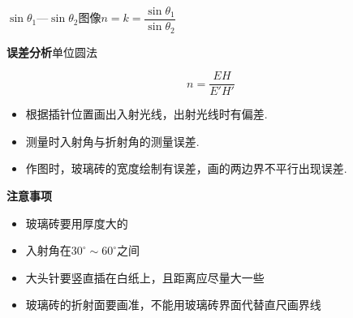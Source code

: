 
$\sin\theta_1$—$\sin\theta_2$图像\qquad $n=k=\dfrac{\sin\theta_1}{\sin\theta_2}$

\textbf{误差分析}\quad 单位圆法


\[ n=\frac{EH}{E'H'} \]

\begin{itemize}
\item[\unclear{①}] 根据插针位置画出入射光线，出射光线时有偏差. %
\item[②] 测量时入射角与折射角的测量误差.
\item[③] 作图时，玻璃砖的宽度绘制有误差，画的两边界不平行出现误差.
\end{itemize}

\textbf{注意事项}
\begin{itemize}
\item 玻璃砖要用厚度大的
\item 入射角在$30^\circ\sim60^\circ$之间
\item 大头针要竖直插在白纸上，且距离应尽量大一些
\item 玻璃砖的折射面要画准，不能用玻璃砖界面代替直尺画界线
\end{itemize}
